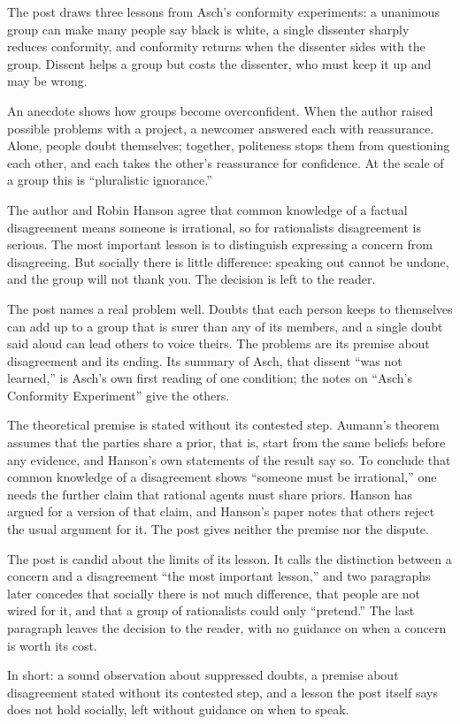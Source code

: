 \begin{afterword}
\summaryhead

The post draws three lessons from Asch's conformity experiments: a unanimous group can make many people say black is white, a single dissenter sharply reduces conformity, and conformity returns when the dissenter sides with the group. Dissent helps a group but costs the dissenter, who must keep it up and may be wrong.

An anecdote shows how groups become overconfident. When the author raised possible problems with a project, a newcomer answered each with reassurance. Alone, people doubt themselves; together, politeness stops them from questioning each other, and each takes the other's reassurance for confidence. At the scale of a group this is ``pluralistic ignorance.''

The author and Robin Hanson agree that common knowledge of a factual disagreement means someone is irrational, so for rationalists disagreement is serious. The most important lesson is to distinguish expressing a concern from disagreeing. But socially there is little difference: speaking out cannot be undone, and the group will not thank you. The decision is left to the reader.

\responsehead

The post names a real problem well. Doubts that each person keeps to themselves can add up to a group that is surer than any of its members, and a single doubt said aloud can lead others to voice theirs. The problems are its premise about disagreement and its ending. Its summary of Asch, that dissent ``was not learned,'' is Asch's own first reading of one condition; the notes on ``Asch's Conformity Experiment'' give the others.

The theoretical premise is stated without its contested step. Aumann's theorem assumes that the parties share a prior, that is, start from the same beliefs before any evidence, and Hanson's own statements of the result say so. To conclude that common knowledge of a disagreement shows ``someone must be irrational,'' one needs the further claim that rational agents must share priors. Hanson has argued for a version of that claim, and Hanson's paper notes that others reject the usual argument for it. The post gives neither the premise nor the dispute.

The post is candid about the limits of its lesson. It calls the distinction between a concern and a disagreement ``the most important lesson,'' and two paragraphs later concedes that socially there is not much difference, that people are not wired for it, and that a group of rationalists could only ``pretend.'' The last paragraph leaves the decision to the reader, with no guidance on when a concern is worth its cost.

In short: a sound observation about suppressed doubts, a premise about disagreement stated without its contested step, and a lesson the post itself says does not hold socially, left without guidance on when to speak.
\end{afterword}
